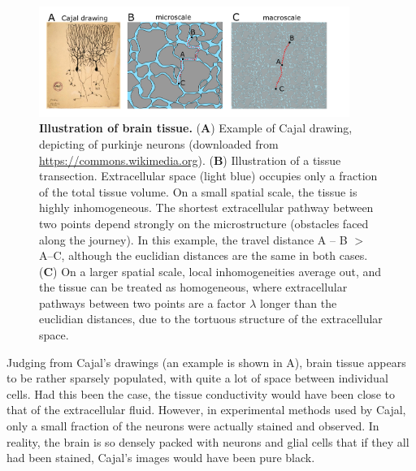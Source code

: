 \begin{figure}[!ht]
\begin{center}
\includegraphics[width=0.9\textwidth]{Figures/Sigma/ecs2.png}
\end{center}
\caption[]{\textbf{Illustration of brain tissue.} 
({\bf A})  Example of Cajal drawing, depicting of purkinje neurons (downloaded from \url{https://commons.wikimedia.org}). 
({\bf B}) Illustration of a tissue transection. Extracellular space (light blue) occupies only a fraction
of the total tissue volume. On a small spatial scale, the tissue is highly inhomogeneous. 
The shortest extracellular pathway between two points depend strongly on the microstructure 
(obstacles faced along the journey).
In this example, the travel distance A -- B $>$ A--C, although the euclidian distances are the same in both cases. 
({\bf C}) On a larger spatial scale, local inhomogeneities average out, 
and the tissue can be treated as homogeneous, where extracellular pathways between two points are
a factor $\lambda$ longer than the euclidian distances, due to the tortuous structure of the extracellular space. 
}
\label{fig:Sigma:ECS}
\end{figure}

Judging from Cajal's drawings (an example is shown in A), 
brain tissue appears to be rather sparsely populated, with quite a lot of space between individual cells. 
Had this been the case, the tissue conductivity would have been close to that of the extracellular fluid. 
However, in experimental methods used by Cajal, only a small fraction of the neurons 
were actually stained and observed. In reality, the brain is so densely packed with neurons and glial cells 
that if they all had been stained, Cajal's images would have been pure black. 

